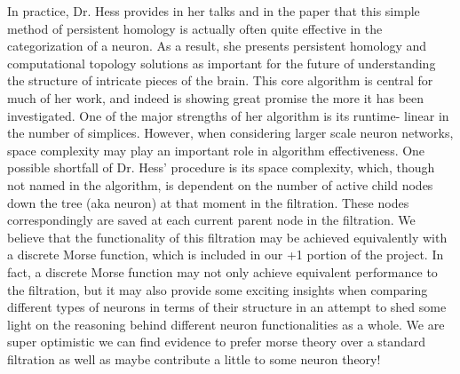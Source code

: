 \documentclass[11pt]{article}
\begin{document}
 
 In practice, Dr. Hess provides in her talks and in the paper that this simple method of persistent homology is actually often quite effective in the categorization of a neuron.
 As a result, she presents persistent homology and computational topology solutions as important for the future of understanding the structure of intricate pieces of the brain.
 This core algorithm is central for much of her work, and indeed is showing great promise the more it has been investigated. One of the major strengths of her algorithm is its runtime-
 linear in the number of simplices. However, when considering larger scale neuron networks, space complexity may play an important role in algorithm effectiveness. One possible shortfall of Dr. Hess' procedure is its space complexity, which, though not named in the algorithm, is dependent on the number of active child nodes down the tree
 (aka neuron) at that moment in the filtration.
 These nodes correspondingly are saved at each current parent node in the filtration. We believe that the functionality of this filtration may be
 achieved equivalently with a discrete Morse function, which is included in our +1 portion of the project. In fact, a discrete Morse function may not only achieve equivalent performance to the filtration,
 but it may also provide some exciting insights when comparing different types of neurons in terms of their structure in an attempt to shed some light on the reasoning behind different neuron functionalities as
 a whole. We are super optimistic we can find evidence to prefer morse theory over a standard filtration as well as maybe contribute a little to some neuron theory!
\end{document}
